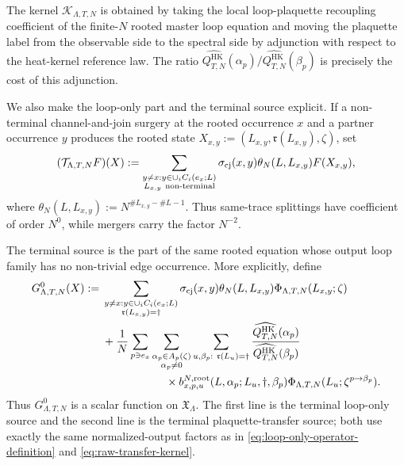 \documentclass[11pt,a4paper,reqno]{amsart}
\theoremstyle{definition}
\theoremstyle{remark}
\newcommand\HK{{\mathrm{HK}}}
\begin{document}
The kernel $\mathcal K_{\Lambda,T,N}$ is obtained by taking the local loop-plaquette recoupling coefficient of the finite-$N$ rooted master loop equation and moving the plaquette label from the observable side to the spectral side by adjunction with respect to the heat-kernel reference law.  The ratio $\widehat{Q_{T,N}^\HK}(\alpha_p)/\widehat{Q_{T,N}^\HK}(\beta_p)$ is precisely the cost of this adjunction.

We also make the loop-only part and the terminal source explicit.  If a non-terminal channel-and-join surgery at the rooted occurrence $x$ and a partner occurrence $y$ produces the rooted state $X_{x,y}:=(L_{x,y},\mathfrak r(L_{x,y}),\zeta)$, set
\begin{equation}\label{eq:loop-only-operator-definition}
(\mathcal T_{\Lambda,T,N}F)(X):=\sum_{\substack{y\neq x: y\in\cup_i C_i(e_x;L)\\ L_{x,y}\ {\rm non\text{-}terminal}}}\sigma_{\rm cj}(x,y) \theta_N(L,L_{x,y}) F(X_{x,y}),
\end{equation}
where $\theta_N(L,L_{x,y}):=N^{\#L_{x,y}-\#L-1}.$ Thus same-trace splittings have coefficient of order $N^0$, while mergers
carry the factor $N^{-2}$.

The terminal source is the part of the same rooted equation whose output loop family has no non-trivial edge occurrence.  More explicitly, define
\begin{align*}
G^0_{\Lambda,T,N}(X)
:={}&
\sum_{\substack{y\ne x: y\in\cup_i C_i(e_x;L)\\ \mathfrak r(L_{x,y})=\dagger}}
\sigma_{\rm cj}(x,y)\theta_N(L,L_{x,y})
\Phi_{\Lambda,T,N}(L_{x,y};\zeta)\\
&+\frac1N\sum_{p\ni e_x}
\sum_{\substack{\alpha_p\in A_p(\zeta)\\ \alpha_p\ne0}}
\sum_{\substack{u,\beta_p:\ \mathfrak r(L_u)=\dagger}}
\frac{\widehat{Q_{T,N}^\HK}(\alpha_p)}
{\widehat{Q_{T,N}^\HK}(\beta_p)}\\
&\hspace{2cm}\times
b^{N,{\rm root}}_{x,p,u}(L,\alpha_p;L_u,\dagger,\beta_p)
\Phi_{\Lambda,T,N}(L_u;\zeta^{p\to\beta_p}).
\end{align*}
Thus $G^0_{\Lambda,T,N}$ is a scalar function on $\mathfrak X_\Lambda$. The first line is the terminal loop-only source and the second line is the terminal plaquette-transfer source; both use exactly the same normalized-output factors as in \eqref{eq:loop-only-operator-definition} and \eqref{eq:raw-transfer-kernel}.
\end{document}
